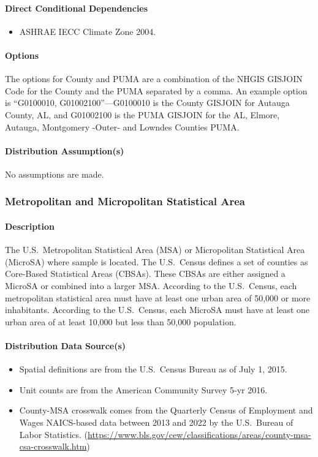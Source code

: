 \paragraph{Direct Conditional Dependencies}
\begin{itemize}
    \item ASHRAE IECC Climate Zone 2004.
\end{itemize}
\paragraph{Options}
The options for County and PUMA are a combination of the NHGIS GISJOIN Code for the County and the PUMA separated by a comma. An example option is ``G0100010, G01002100''---G0100010 is the County GISJOIN for Autauga County, AL, and G01002100 is the PUMA GISJOIN for the AL, Elmore, Autauga, Montgomery -Outer- and Lowndes Counties PUMA.

\paragraph{Distribution Assumption(s)}
No assumptions are made.

\subsubsection{Metropolitan and Micropolitan Statistical Area}
\paragraph{Description}
The U.S.~Metropolitan Statistical Area (MSA) or Micropolitan Statistical Area (MicroSA) where sample is located. The U.S.~Census defines a set of counties as Core-Based Statistical Areas (CBSAs). These CBSAs are either assigned a MicroSA or combined into a larger MSA. According to the U.S.~Census, each metropolitan statistical area must have at least one urban area of 50,000 or more inhabitants. According to the U.S.~Census, each MicroSA must have at least one urban area of at least 10,000 but less than 50,000 population.

\paragraph{Distribution Data Source(s)}
\begin{itemize}
 
\item
  Spatial definitions are from the U.S.~Census Bureau as of July 1,
  2015.
\item
  Unit counts are from the American Community Survey 5-yr 2016.
\item
  County-MSA crosswalk comes from the Quarterly Census of Employment and
  Wages NAICS-based data between 2013 and 2022 by the U.S.~Bureau of Labor
  Statistics.
  (\url{https://www.bls.gov/cew/classifications/areas/county-msa-csa-crosswalk.htm})
\end{itemize}

